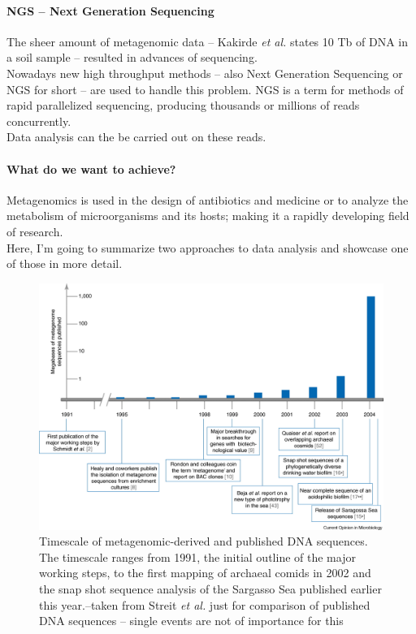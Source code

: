 \documentclass[twocolumn]{bmcart}%
\begin{document}
\paragraph*{NGS -- Next Generation Sequencing}
The sheer amount of metagenomic data -- Kakirde \textit{et al.}\cite{KAKIRDE20101911} states 10 Tb of DNA in a soil sample -- resulted in advances of sequencing.\\
Nowadays new high throughput methods -- also Next Generation Sequencing or NGS for short -- are used to handle this problem. NGS is a term for methods of rapid parallelized sequencing, producing thousands or millions of reads concurrently.\\
 Data analysis can the be carried out on these reads.
\paragraph*{What do we want to achieve?}
Metagenomics is used in the design of antibiotics and medicine or to analyze the metabolism of microorganisms and its hosts; making it a rapidly developing field of research.\\
Here, I'm going to summarize two approaches to data analysis and showcase one of those in more detail.
\begin{figure}
	\centering
\includegraphics[width=.9\linewidth]{bilder/growth_of_novel_gene_discovery.jpg}	
\caption{Timescale of metagenomic-derived and published DNA sequences. The timescale ranges from 1991, the initial outline of the major working steps, to the first mapping of archaeal comids in 2002 and the snap shot sequence analysis of the Sargasso Sea published earlier this year.--taken from Streit \textit{et al.} \cite{STREIT2004492} just for comparison of published DNA sequences -- single events are not of importance for this}
\label{img:nov_gene_discov}
\end{figure}
\end{document}
